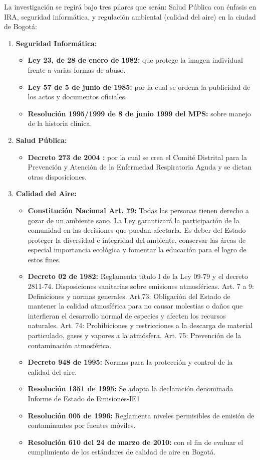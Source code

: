 \documentclass[a4paper, 12pt, oneside]{article}
\theoremstyle{definition}
\theoremstyle{remark}
\begin{document}
La investigación se regirá bajo tres pilares que serán: Salud Pública con énfasis en IRA, seguridad informática, y regulación ambiental (calidad del aire) en la ciudad de Bogotá:
\begin{enumerate}[I]%
\item\textbf{Seguridad Informática:}
	\begin{itemize}   
	\item\textbf{Ley 23, de 28 de enero de 1982: }que protege la imagen individual frente a varias formas de abuso.
    \item\textbf{Ley 57 de 5 de junio de 1985: } por la cual se ordena la publicidad de los actos y documentos oficiales.
    \item\textbf{Resolución 1995/1999 de 8 de junio 1999 del MPS: } sobre manejo de la historia clínica.
   
	\end{itemize}
\item\textbf{Salud Pública:}
	\begin{itemize}
	\item\textbf{Decreto 273 de 2004 :} por la cual se crea el Comité Distrital para la Prevención y Atención de la Enfermedad Respiratoria Aguda y se dictan otras disposiciones.
	\end{itemize}
\item\textbf{Calidad del Aire:}
	\begin{itemize}
    \item\textbf{Constitución Nacional Art. 79: }  Todas las personas tienen derecho a gozar de un ambiente sano. La Ley garantizará la participación de la comunidad en las decisiones que puedan afectarla. Es deber del Estado proteger la diversidad e integridad del ambiente, conservar las áreas de 	especial importancia ecológica y fomentar la educación para el logro de estos fines.
    \item\textbf{Decreto 02 de 1982: } Reglamenta título I de la Ley 09-79 y el decreto 2811-74. Disposiciones sanitarias sobre emisiones atmosféricas. Art. 7 a 9: Definiciones y normas generales. Art.73: Obligación del Estado de mantener la calidad atmosférica para no causar molestias o daños que interfieran el desarrollo normal de especies y afecten los recursos 	naturales. Art. 74: Prohibiciones y restricciones a la descarga de material particulado, gases y vapores a la atmósfera. Art. 75: Prevención de la contaminación atmosférica.
    \item\textbf{Decreto 948 de 1995: } Normas para la protección y control de la calidad del aire.
    \item\textbf{Resolución 1351 de 1995: } Se adopta la declaración denominada Informe de Estado de Emisiones-IE1
    \item\textbf{Resolución 005 de 1996: } Reglamenta niveles permisibles de emisión de contaminantes por fuentes móviles.
    \item\textbf{Resolución 610 del 24 de marzo de 2010: } con el fin de evaluar el cumplimiento de los estándares de calidad de aire en Bogotá.
\end{itemize}
\end{enumerate}
\clearpage
\end{document}
